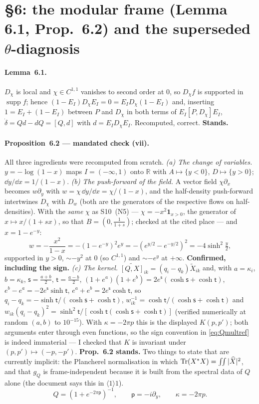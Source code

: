 \documentclass[11pt]{article}
\begin{document}
\section{\S6: the modular frame (Lemma 6.1, Prop.~6.2) and the superseded $\theta$-diagnosis}\label{sec:theta}

\paragraph{Lemma~6.1.}  $D_\chi$ is local and $\chi\in C^{1,1}$ vanishes to second order at
$0$, so $D_\chi f$ is supported in $\operatorname{supp}f$; hence
$(1-E_I)D_\chi E_I=0=E_ID_\chi(1-E_I)$ and, inserting $1=E_I+(1-E_I)$ between $P$ and
$D_\chi$ in both terms of $E_I[P,D_\chi]E_I$, $\dot\delta=Qd-dQ=[Q,d]$ with $d=E_ID_\chi E_I$.
Recomputed, correct.  \textbf{Stands.}

\paragraph{Proposition~6.2 --- mandated check (vii).}  All three ingredients were
recomputed from scratch.
\emph{(a) The change of variables.}  $y=-\log(1-x)$ maps $I=(-\infty,1)$ onto $\mathbb R$
with $A\mapsto\{y<0\}$, $D\mapsto\{y>0\}$; $\dd y/\dd x=1/(1-x)$.
\emph{(b) The push-forward of the field.}  A vector field $\chi\partial_x$ becomes
$w\partial_y$ with $w=\chi\,\dd y/\dd x=\chi/(1-x)$, and the half-density push-forward
intertwines $D_\chi$ with $D_w$ (both are the generators of the respective flows on
half-densities).  With the \emph{same} $\chi$ as S10~(N5) --- $\chi=-x^2\mathbf1_{x>0}$,
the generator of $x\mapsto x/(1+sx)$, so that $B=(0,\frac1{1+s})$; checked at the cited
place --- and $x=1-e^{-y}$:
\[ w=-\frac{x^2}{1-x}=-(1-e^{-y})^2e^{y}=-(e^{y/2}-e^{-y/2})^2=-4\sinh^2\tfrac y2 , \]
supported in $y>0$, $\sim-y^2$ at $0$ (so $C^{1,1}$) and $\sim-e^{y}$ at $+\infty$.
\textbf{Confirmed, including the sign.}
\emph{(c) The kernel.}  $\widetilde{[Q,X]}_{ik}=(q_i-q_k)\widetilde X_{ik}$ and, with
$a=\kappa_i$, $b=\kappa_k$, $\mathsf s=\frac{a+b}2$, $\mathsf t=\frac{a-b}2$,
$(1+e^a)(1+e^b)=2e^{\mathsf s}(\cosh\mathsf s+\cosh\mathsf t)$, $e^b-e^a=-2e^{\mathsf s}\sinh\mathsf t$,
$e^a+e^b=2e^{\mathsf s}\cosh\mathsf t$, so
$q_i-q_k=-\sinh\mathsf t/(\cosh\mathsf s+\cosh\mathsf t)$,
$w_{ik}^{-1}=\cosh\mathsf t/(\cosh\mathsf s+\cosh\mathsf t)$ and
$w_{ik}(q_i-q_k)^2=\sinh^2\mathsf t/[\cosh\mathsf t(\cosh\mathsf s+\cosh\mathsf t)]$
(verified numerically at random $(a,b)$ to $10^{-15}$).  With $\kappa=-2\pi p$ this is the
displayed $K(p,p')$; both arguments enter through even functions, so the sign convention in
\eqref{eq:Qmultref} is indeed immaterial --- I checked that $K$ is invariant under
$(p,p')\mapsto(-p,-p')$.  \textbf{Prop.~6.2 stands.}  Two things to state that are
currently implicit: the Plancherel normalisation in which
$\operatorname{Tr}(X^*X)=\iint|\widehat X|^2$, and that $g_Q$ is frame-independent because it is built
from the spectral data of $Q$ alone (the document says this in $\langle1\rangle1$).
\begin{equation}\label{eq:Qmultref}
 Q=(1+e^{-2\pi\mathsf p})^{-1},\qquad \mathsf p=-i\partial_y,\qquad \kappa=-2\pi p .
\end{equation}
\end{document}
